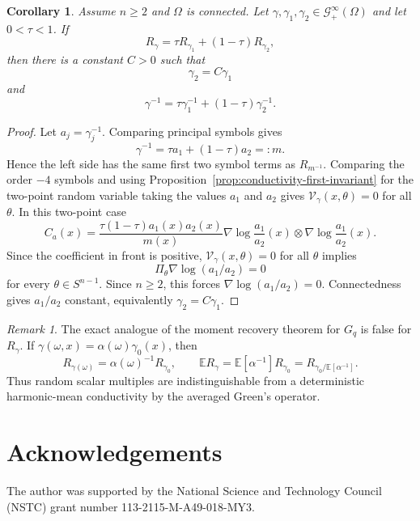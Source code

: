\documentclass[11pt]{article}
\newcommand{\OmegaD}{\Omega}
\newcommand{\E}{\mathbb E}
\theoremstyle{plain}
\newtheorem{corollary}[theorem]{Corollary}
\theoremstyle{definition}
\theoremstyle{remark}
\newtheorem{remark}[theorem]{Remark}
\begin{document}
\begin{corollary}\label{cor:conductivity-Green-rigidity}
Assume $n\ge2$ and $\OmegaD$ is connected.  Let $\gamma,\gamma_1,\gamma_2\in\mathcal G_+^\infty(\OmegaD)$ and let $0<\tau<1$.  If
\[
  R_\gamma=\tau R_{\gamma_1}+(1-\tau)R_{\gamma_2},
\]
then there is a constant $C>0$ such that
\[
  \gamma_2=C\gamma_1
\]
and
\[
  \gamma^{-1}=\tau\gamma_1^{-1}+(1-\tau)\gamma_2^{-1}.
\]
\end{corollary}

\begin{proof}
Let $a_j=\gamma_j^{-1}$.  Comparing principal symbols gives
\[
  \gamma^{-1}=\tau a_1+(1-\tau)a_2=:m.
\]
Hence the left side has the same first two symbol terms as $R_{m^{-1}}$.  Comparing the order $-4$ symbols and using Proposition~\ref{prop:conductivity-first-invariant} for the two-point random variable taking the values $a_1$ and $a_2$ gives $\mathcal V_\gamma(x,\theta)=0$ for all $\theta$.  In this two-point case
\[
  C_a(x)=\frac{\tau(1-\tau)a_1(x)a_2(x)}{m(x)}
  \nabla\log\frac{a_1}{a_2}(x)
  \otimes
  \nabla\log\frac{a_1}{a_2}(x).
\]
Since the coefficient in front is positive, $\mathcal V_\gamma(x,\theta)=0$ for all $\theta$ implies
\[
  \Pi_\theta\nabla\log(a_1/a_2)=0
\]
for every $\theta\in S^{n-1}$.  Since $n\ge2$, this forces $\nabla\log(a_1/a_2)=0$.  Connectedness gives $a_1/a_2$ constant, equivalently $\gamma_2=C\gamma_1$.
\end{proof}

\begin{remark}
The exact analogue of the moment recovery theorem for $G_q$ is false for $R_\gamma$.  If $\gamma(\omega,x)=\alpha(\omega)\gamma_0(x)$, then
\[
  R_{\gamma(\omega)}=\alpha(\omega)^{-1}R_{\gamma_0},
  \qquad
  \E R_\gamma=\E[\alpha^{-1}]R_{\gamma_0}
  =R_{\gamma_0/\E[\alpha^{-1}]}.
\]
Thus random scalar multiples are indistinguishable from a deterministic harmonic-mean conductivity by the averaged Green's operator.
\end{remark}

\section*{Acknowledgements}
The author was supported by the National Science and Technology Council (NSTC) grant number 113-2115-M-A49-018-MY3.



\end{document}
